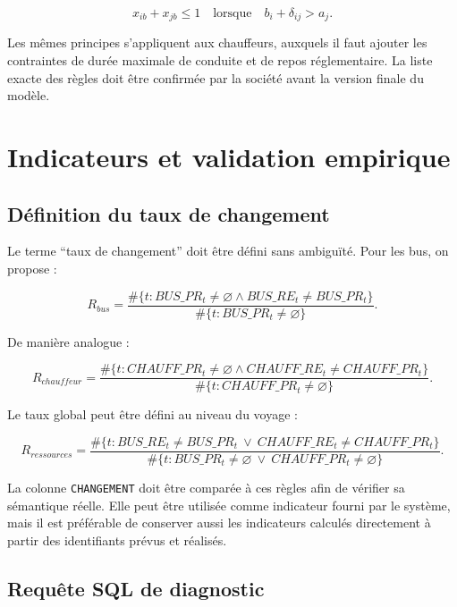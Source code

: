 \documentclass[12pt,a4paper]{article}
\newcommand{\code}[1]{\texttt{#1}}
\begin{document}
\begin{equation}
x_{ib}+x_{jb}\leq 1
\quad\text{lorsque}\quad
b_i+\delta_{ij}>a_j.
\end{equation}

Les mêmes principes s’appliquent aux chauffeurs, auxquels il faut ajouter les contraintes de durée maximale de conduite et de repos réglementaire. La liste exacte des règles doit être confirmée par la société avant la version finale du modèle.

\section{Indicateurs et validation empirique}

\subsection{Définition du taux de changement}

Le terme \enquote{taux de changement} doit être défini sans ambiguïté. Pour les bus, on propose :

\begin{equation}
R_{bus}=\frac{\#\{t: BUS\_PR_t\neq\varnothing \land BUS\_RE_t\neq BUS\_PR_t\}}{\#\{t: BUS\_PR_t\neq\varnothing\}}.
\end{equation}

De manière analogue :

\begin{equation}
R_{chauffeur}=\frac{\#\{t: CHAUFF\_PR_t\neq\varnothing \land CHAUFF\_RE_t\neq CHAUFF\_PR_t\}}{\#\{t: CHAUFF\_PR_t\neq\varnothing\}}.
\end{equation}

Le taux global peut être défini au niveau du voyage :

\begin{equation}
R_{ressources}=\frac{\#\{t: BUS\_RE_t\neq BUS\_PR_t\ \lor\ CHAUFF\_RE_t\neq CHAUFF\_PR_t\}}{\#\{t: BUS\_PR_t\neq\varnothing\ \lor\ CHAUFF\_PR_t\neq\varnothing\}}.
\end{equation}

La colonne \code{CHANGEMENT} doit être comparée à ces règles afin de vérifier sa sémantique réelle. Elle peut être utilisée comme indicateur fourni par le système, mais il est préférable de conserver aussi les indicateurs calculés directement à partir des identifiants prévus et réalisés.

\subsection{Requête SQL de diagnostic}
\end{document}
